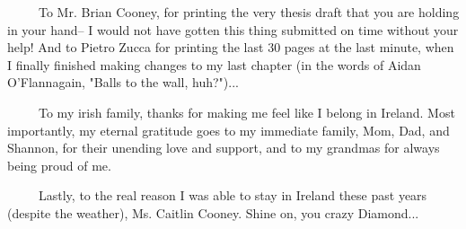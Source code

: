 \begin{acknowledgements}
~~~~~To Mr. Brian Cooney, for printing the very thesis draft that you are holding in your hand-- I would not have gotten this thing submitted on time without your help! And to Pietro Zucca for printing the last 30 pages at the last minute, when I finally finished making changes to my last chapter (in the words of Aidan O'Flannagain, "Balls to the wall, huh?")...

~~~~~To my irish family, thanks for making me feel like I belong in Ireland.
Most importantly, my eternal gratitude goes to my immediate family, Mom, Dad, and Shannon, for their unending love and support, and to my grandmas for always being proud of me.

~~~~~Lastly, to the real reason I was able to stay in Ireland these past years (despite the weather), Ms. Caitlin Cooney. Shine on, you crazy Diamond...
\end{acknowledgements}
